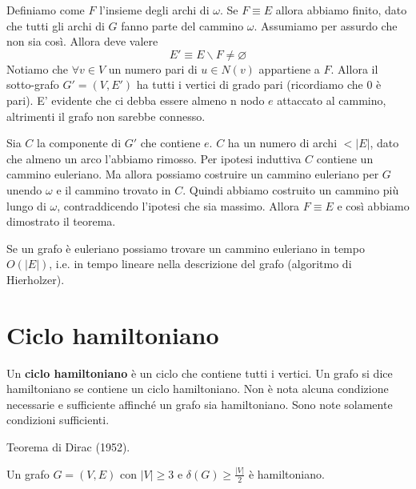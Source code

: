 \documentclass[12pt]{report}
\begin{document}
\begin{dimo}
    \noindent 
    Definiamo come $F$ l'insieme degli archi di $\omega$. Se $F \equiv E$ allora abbiamo finito, dato che tutti gli archi di $G$ fanno parte del cammino $\omega$. Assumiamo per assurdo che non sia così. Allora deve valere $$E' \equiv E \backslash F \neq \varnothing$$ 
    Notiamo che $\forall v \in V$ un numero pari di $u \in N(v)$ appartiene a $F$.  Allora il sotto-grafo $G' = (V,E')$ ha tutti i vertici di grado pari (ricordiamo che $0$ è pari). E' evidente che ci debba essere almeno n nodo $e$ attaccato al cammino, altrimenti il grafo non sarebbe connesso.

        
    Sia $C$ la componente di $G'$ che contiene $e$. $C$ ha un numero di archi $< |E|$, dato che almeno un arco l'abbiamo rimosso. Per ipotesi induttiva $C$ contiene un cammino euleriano. Ma allora possiamo costruire un cammino euleriano per $G$ unendo $\omega$ e il cammino trovato in $C$. Quindi abbiamo costruito un cammino più lungo di $\omega$, contraddicendo l'ipotesi che sia massimo. Allora $F \equiv E$ e così abbiamo dimostrato il teorema. 
\end{dimo}

\noindent 
Se un grafo è euleriano possiamo trovare un cammino euleriano in tempo $O(|E|)$, i.e. in tempo lineare nella descrizione del grafo (algoritmo di Hierholzer). 

\section{Ciclo hamiltoniano}
Un \textbf{ciclo hamiltoniano} è un ciclo che contiene tutti i vertici.  Un grafo si dice hamiltoniano se contiene un ciclo hamiltoniano. Non è nota alcuna condizione necessarie e sufficiente affinché un grafo sia hamiltoniano. Sono note solamente condizioni sufficienti.

\begin{teo}
    Teorema di Dirac (1952).

    \noindent
    Un grafo $G = (V,E)$ con $|V| \geq 3$ e $\delta(G) \geq \frac{|V|}{2}$ è hamiltoniano. 
\end{teo}
\end{document}

